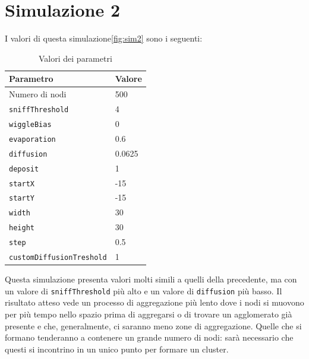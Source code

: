 \section{Simulazione 2}\label{sim2}
I valori di questa simulazione\space \cref{fig:sim2} sono i seguenti:
\begin{table}[ht]
    \centering
    \caption{Valori dei parametri}
    \begin{tabular}{ll}
        \hline
        Parametro                   & Valore \\
        \hline
        Numero di nodi              & 500    \\
        \texttt{sniffThreshold}     & 4      \\
        \texttt{wiggleBias}         & 0      \\
        \texttt{evaporation}        & 0.6    \\
        \texttt{diffusion}          & 0.0625 \\
        \texttt{deposit}            & 1      \\
        \texttt{startX}             & -15    \\
        \texttt{startY}             & -15    \\
        \texttt{width}              & 30     \\
        \texttt{height}             & 30     \\
        \texttt{step}               & 0.5    \\
        \texttt{customDiffusionTreshold} & 1 \\
        \hline
    \end{tabular}\label{tab:parametr2}
\end{table}\newline
Questa simulazione presenta valori molti simili a quelli della precedente, ma con un valore di \texttt{sniffThreshold} più alto e un valore di \texttt{diffusion} più basso.
Il risultato atteso vede un processo di aggregazione più lento dove i nodi si muovono per più tempo nello spazio prima di aggregarsi o di trovare un 
agglomerato già presente e che, generalmente, ci saranno meno zone di aggregazione. Quelle che si formano 
tenderanno a contenere un grande numero di nodi: sarà necessario che questi si incontrino in un unico punto per formare un cluster.

